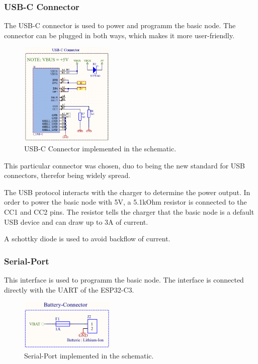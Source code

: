     \subsubsection{USB-C Connector}

    The USB-C connector is used to power and programm the basic node. The connector can
    be plugged in both ways, which makes it more user-friendly.

    \begin{figure}[H]
        \centering
        \includegraphics[width=0.4\textwidth]{assets/HW/USB-C-schematic.png}
        \caption{USB-C Connector implemented in the schematic.}
    \end{figure}

    This particular connector was chosen, duo to being the new standard for USB connectors, 
    therefor being widely spread.
    
    The USB protocol interacts with the charger to determine the power output. In order to
    power the basic node with 5V, a 5.1kOhm resistor is connected to the CC1 and CC2 pins.
    The resistor tells the charger that the basic node is a default USB device and can draw
    up to 3A of current.\cite{noauthor_fugen_2023}

    A schottky diode is used to avoid backflow of current.

    \subsubsection{Serial-Port}

    This interface is used to programm the basic node. The interface is connected directly
    with the UART of the ESP32-C3. 

    \begin{figure}[H]
        \centering
        \includegraphics[width=0.4\textwidth]{assets/HW/Serial-Port-schematic.png}
        \caption{Serial-Port implemented in the schematic.}
    \end{figure}
    
